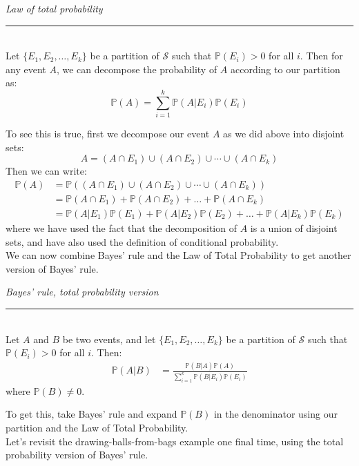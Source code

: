 \documentclass[12pt]{article}
\theoremstyle{definition}
\theoremstyle{remark}
\def\P{{\mathbb P}}
\def\cals{{\mathcal S}}
\begin{document}
\begin{framed}
\emph{Law of total probability}\\
  \rule{\dimexpr{}\fboxrule}{.1pt} \\
Let $\{E_1, E_2, \dots, E_k\}$ be a partition of $\cals$ such that $\P(E_i) > 0$ for all $i$. Then for any event $A$, we can decompose the probability of $A$ according to our partition as:
\[
\P(A) = \sum_{i = 1}^k \P(A|E_i)\P(E_i)
\]
\end{framed}
To see this is true, first we decompose our event $A$ as we did above into disjoint sets:
\[
A = (A \cap E_1) \cup (A \cap E_2) \cup \cdots \cup (A \cap E_k)
\]
Then we can write:
\begin{align*}
\P(A) &= \P( (A \cap E_1) \cup (A \cap E_2) \cup \cdots \cup (A \cap E_k) ) \\
&= \P(A \cap E_1) + \P(A \cap E_2) + \dots + \P(A \cap E_k) \\
&= \P(A|E_1)\P(E_1) + \P(A|E_2)\P(E_2) + \dots + \P(A|E_k)\P(E_k) 
\end{align*}
where we have used the fact that the decomposition of $A$ is a union of disjoint sets, and have also used the definition of conditional probability.\\

We can now combine Bayes' rule and the Law of Total Probability to get another version of Bayes' rule.

\begin{framed}
\emph{Bayes' rule, total probability version}\\
  \rule{\dimexpr{}\fboxrule}{.1pt} \\
Let $A$ and $B$ be two events, and let $\{E_1, E_2, \dots, E_k\}$ be a partition of $\cals$ such that $\P(E_i) > 0$ for all $i$. Then:
\begin{align*}
\P(A | B) &= \frac{ \P(B|A)\P(A)}{\sum_{i=1}^k \P(B|E_i)\P(E_i)}
\end{align*}
where $\P(B) \neq 0.$
\end{framed}
To get this, take Bayes' rule and expand $\P(B)$ in the denominator using our partition and the Law of Total Probability.\\

Let's revisit the drawing-balls-from-bags example one final time, using the total probability version of Bayes' rule.
\end{document}
